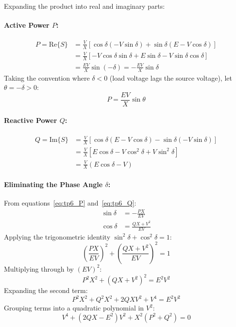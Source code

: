 Expanding the product into real and imaginary parts:
\paragraph{Active Power $P$:}
\begin{align}
    P = \text{Re}\{S\} &= \frac{V}{X} \left[ \cos\delta (-V\sin\delta) + \sin\delta (E - V\cos\delta) \right] \nonumber\\
                       &= \frac{V}{X} \left[ -V\cos\delta\sin\delta + E\sin\delta - V\sin\delta\cos\delta \right] \nonumber\\
                       &= \boxed{\frac{EV}{X} \sin(-\delta) = -\frac{EV}{X}\sin\delta} \label{eq:tp6_P}
\end{align}
Taking the convention where $\delta < 0$ (load voltage lags the source voltage), let $\theta = -\delta > 0$:
\begin{equation}
    P = \frac{EV}{X} \sin\theta
\end{equation}

\paragraph{Reactive Power $Q$:}
\begin{align}
    Q = \text{Im}\{S\} &= \frac{V}{X} \left[ \cos\delta (E - V\cos\delta) - \sin\delta (-V\sin\delta) \right] \nonumber\\
                       &= \frac{V}{X} \left[ E\cos\delta - V\cos^2\delta + V\sin^2\delta \right] \nonumber\\
                       &= \boxed{\frac{V}{X} (E\cos\delta - V)} \label{eq:tp6_Q}
\end{align}

\paragraph{Eliminating the Phase Angle $\delta$:}
From equations~\eqref{eq:tp6_P} and~\eqref{eq:tp6_Q}:
\begin{align}
    \sin\delta &= -\frac{PX}{EV} \label{eq:tp6_sindelta}\\
    \cos\delta &= \frac{QX + V^2}{EV} \label{eq:tp6_cosdelta}
\end{align}
Applying the trigonometric identity $\sin^2\delta + \cos^2\delta = 1$:
\begin{equation}
    \left( \frac{PX}{EV} \right)^2 + \left( \frac{QX + V^2}{EV} \right)^2 = 1
\end{equation}
Multiplying through by $(EV)^2$:
\begin{equation}
    P^2 X^2 + (QX + V^2)^2 = E^2 V^2
\end{equation}
Expanding the second term:
\begin{equation}
    P^2 X^2 + Q^2 X^2 + 2 Q X V^2 + V^4 = E^2 V^2
\end{equation}
Grouping terms into a quadratic polynomial in $V^2$:
\begin{equation}
    \boxed{V^4 + (2QX - E^2) V^2 + X^2(P^2 + Q^2) = 0} \label{eq:tp6_biquadratic}
\end{equation}

